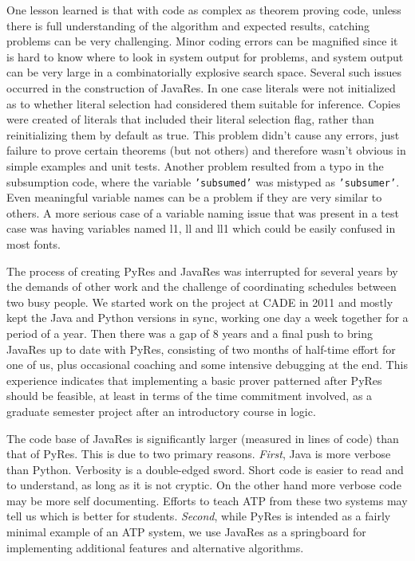 \documentclass{llncs}
\begin{document}
One lesson learned is that with code as complex as theorem proving
code, unless there is full understanding of the algorithm and expected
results, catching problems can be very challenging.  Minor coding
errors can be magnified since it is hard to know where to look in
system output for problems, and system output can be very large in a
combinatorially explosive search space.  Several such issues occurred
in the construction of JavaRes.  In one case literals were not
initialized as to whether literal selection had considered them
suitable for inference.  Copies were created of literals that included
their literal selection flag, rather than reinitializing them by
default as true.  This problem didn't cause any errors, just failure
to prove certain theorems (but not others) and therefore wasn't
obvious in simple examples and unit tests.  Another problem resulted
from a typo in the subsumption code, where the variable
\texttt{'subsumed'} was mistyped as \texttt{'subsumer'}.  Even
meaningful variable names can be a problem if they are very similar to
others.  A more serious case of a variable naming issue that was
present in a test case was having variables named l1, ll and ll1 which
could be easily confused in most fonts.

The process of creating PyRes and JavaRes was interrupted for several
years by the demands of other work and the challenge of coordinating
schedules between two busy people.  We started work on the project at
CADE in 2011 and mostly kept the Java and Python versions in sync,
working one day a week together for a period of a year.  Then there was a gap of 8 years and
a final push to bring JavaRes up to date with PyRes, consisting of two
months of half-time effort for one of us, plus occasional coaching and
some intensive debugging at the end.  This experience indicates that
implementing a basic prover patterned after PyRes should be feasible,
at least in terms of the time commitment involved, as a
graduate semester project after an introductory course in logic.

The code base of JavaRes is significantly larger (measured in lines of
code) than that of PyRes. This is due to two primary reasons. \textit{First}, Java
is more verbose than Python.  Verbosity is a double-edged sword. Short code is easier to
read and to understand, as long as it is not cryptic. On the other
hand more verbose code may be more self documenting. Efforts to teach
ATP from these two systems may tell us which is better for students.
%
\textit{Second}, while PyRes is intended as a fairly minimal example of an ATP system, we
use JavaRes as a springboard for implementing additional features
and alternative algorithms.
\end{document}
